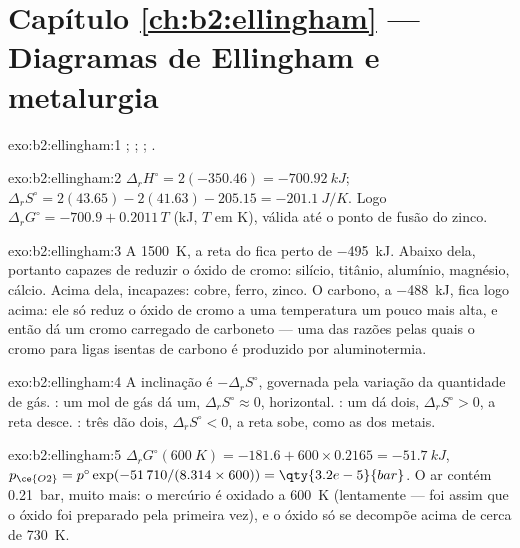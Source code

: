 \section*{Capítulo \ref{ch:b2:ellingham} --- Diagramas de Ellingham e metalurgia}

\begin{solution}{exo:b2:ellingham:1}
; ; ;
.
\end{solution}

\begin{solution}{exo:b2:ellingham:2}
$\Delta_r H^\circ = 2(-350.46) = \qty{-700.92}{kJ}$; $\Delta_r S^\circ = 2(43.65)
- 2(41.63) - 205.15 = \qty{-201.1}{J/K}$. Logo $\Delta_r G^\circ = -700.9 +
0.2011\,T$ (\unit{kJ}, $T$ em \unit{K}), válida até o ponto de fusão do zinco.
\end{solution}

\begin{solution}{exo:b2:ellingham:3}
A \qty{1500}{K}, a reta do  fica perto de \qty{-495}{kJ}. Abaixo dela,
portanto capazes de reduzir o óxido de cromo: silício, titânio, alumínio,
magnésio, cálcio. Acima dela, incapazes: cobre, ferro, zinco. O carbono, a
\qty{-488}{kJ}, fica logo acima: ele só reduz o óxido de cromo a uma
temperatura um pouco mais alta, e então dá um cromo carregado de carboneto
--- uma das razões pelas quais o cromo para ligas isentas de carbono é
produzido por aluminotermia.
\end{solution}

\begin{solution}{exo:b2:ellingham:4}
A inclinação é $-\Delta_r S^\circ$, governada pela variação da quantidade de
gás. : um mol de gás dá um, $\Delta_r S^\circ \approx 0$,
horizontal. : um dá dois, $\Delta_r S^\circ > 0$, a reta
desce. : três dão dois, $\Delta_r S^\circ < 0$, a reta
sobe, como as dos metais.
\end{solution}

\begin{solution}{exo:b2:ellingham:5}
$\Delta_r G^\circ(\qty{600}{K}) = -181.6 + 600 \times 0.2165 = \qty{-51.7}{kJ}$,
$p_{\ce{O2}} = p^\circ\exp(-51\,710/(8.314 \times 600)) = \qty{3.2e-5}{bar}$. O ar
contém \qty{0.21}{bar}, muito mais: o mercúrio é oxidado a \qty{600}{K}
(lentamente --- foi assim que o óxido foi preparado pela primeira vez), e o
óxido só se decompõe acima de cerca de \qty{730}{K}.
\end{solution}

